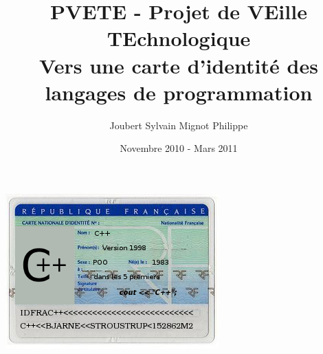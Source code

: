 \documentclass[a4paper, 11pt]{article}
\title{PVETE - Projet de VEille TEchnologique \\
Vers une carte d'identité des langages de programmation}
\author{{\sc Joubert} Sylvain \hspace{1cm} {\sc Mignot} Philippe}
\date{Novembre 2010 - Mars 2011}
\begin{document}

\begin{titlepage}
\maketitle
\vspace*{\fill}
\begin{center}
\includegraphics[scale=1.2]{img/carte.png}
\vspace*{\fill}
\end{center}
\end{titlepage}

\tableofcontents
\newpage








\end{document}
